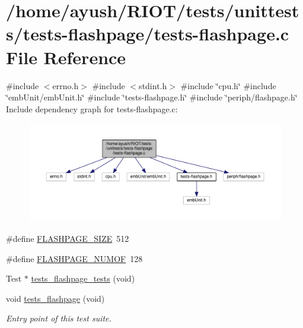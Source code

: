 \hypertarget{tests-flashpage_8c}{}\section{/home/ayush/\+R\+I\+O\+T/tests/unittests/tests-\/flashpage/tests-\/flashpage.c File Reference}
\label{tests-flashpage_8c}
{\ttfamily \#include $<$errno.\+h$>$}\newline
{\ttfamily \#include $<$stdint.\+h$>$}\newline
{\ttfamily \#include \char`\"{}cpu.\+h\char`\"{}}\newline
{\ttfamily \#include \char`\"{}emb\+Unit/emb\+Unit.\+h\char`\"{}}\newline
{\ttfamily \#include \char`\"{}tests-\/flashpage.\+h\char`\"{}}\newline
{\ttfamily \#include \char`\"{}periph/flashpage.\+h\char`\"{}}\newline
Include dependency graph for tests-\/flashpage.c\+:
\nopagebreak
\begin{figure}[H]
\begin{center}
\leavevmode
\includegraphics[width=350pt]{tests-flashpage_8c__incl}
\end{center}
\end{figure}
\begin{DoxyCompactItemize}
\item 
\#define \hyperlink{tests-flashpage_8c_afce96cb577e50c76434ba92363ca20e8}{F\+L\+A\+S\+H\+P\+A\+G\+E\+\_\+\+S\+I\+ZE}~512
\item 
\#define \hyperlink{tests-flashpage_8c_a7c969ee021b57668fd1965bbe9ca1a0a}{F\+L\+A\+S\+H\+P\+A\+G\+E\+\_\+\+N\+U\+M\+OF}~128
\item 
Test $\ast$ \hyperlink{tests-flashpage_8c_adaa14e5b0014cf679d44aad17f8ab02f}{tests\+\_\+flashpage\+\_\+tests} (void)
\item 
void \hyperlink{group__unittests_ga4e4d5da67e11b5dccfc097568ed36d82}{tests\+\_\+flashpage} (void)
\begin{DoxyCompactList}\small\item\em Entry point of this test suite. \end{DoxyCompactList}\end{DoxyCompactItemize}


